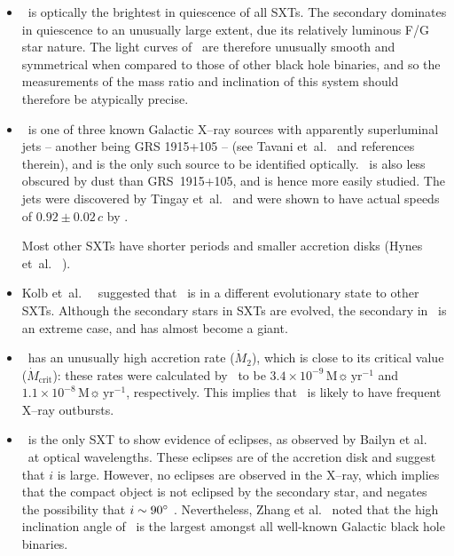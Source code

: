 \begin{itemize}

\item %
\groj\ is optically the brightest in quiescence of all SXTs. %
The secondary dominates in quiescence to an unusually large extent,
due its relatively luminous F/G star nature.
The light curves of \groj\ are therefore unusually smooth and
symmetrical when compared to those of other black hole binaries, and
so the measurements of the mass ratio and inclination of this system
should therefore be atypically precise. %

\item
\groj\ is one of three known Galactic X--ray sources with apparently superluminal
jets -- another being GRS 1915+105 -- (see Tavani et~al.\ %
and references therein), and is the only such source to be identified
optically. \groj\ is also less obscured by dust than \mbox{GRS 1915+105}, and is hence more easily studied.
The jets were discovered by Tingay et~al.\ %
\citeyear{Tingay_et_al.:1995} %
and were shown to have actual speeds of $0.92 \pm 0.02\,c$ by %
. %

Most other SXTs have shorter periods and smaller accretion disks %
(Hynes et~al.\ %
).%

\item Kolb et~al.\ %
\citeyear{Kolb_et_al.:1997}%
\ suggested that \groj\ is in a different evolutionary state to other
SXTs. %
Although the secondary stars in SXTs are evolved, the secondary in
\groj\ is an extreme case, and has almost become a giant. %

\item
\groj\ has an unusually high accretion rate ($\dot{M}_{2}$), which
is close to its critical value ($\dot{M}_{\mathrm{crit}}$): these
rates were calculated by %
%
\ to be $3.4\times10^{-9}\,\mathrm{M}\sun\,\mathrm{yr}^{-1}$ and
$1.1\times10^{-8}\,\mathrm{M}\sun\,\mathrm{yr}^{-1}$,
respectively. This implies that \groj\ is likely to have frequent
X--ray outbursts. %



\item \groj\ is the only SXT to show evidence of eclipses, as observed by
Bailyn et al.\ %
\citeyear{BailynOroszGirad_et_al.:1995}%
\ at optical wavelengths. These eclipses are of the
accretion disk and suggest that $i$ is large. However, no eclipses are
observed in the X--ray, which implies that the compact object is not
eclipsed by the secondary star, and negates the possibility that
$i\sim90\hbox{$^\circ$}$ %
\cite{OroszBailyn:1997}%
. Nevertheless, Zhang et al.\ %
\citeyear{Zhang_et_al.:1997} %
noted that the high inclination angle of \groj\ is the largest amongst
all well-known Galactic black hole binaries. %


\end{itemize}
